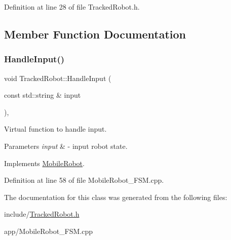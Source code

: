 Definition at line 28 of file Tracked\+Robot.\+h.



\subsection{Member Function Documentation}
\mbox{\label{class_tracked_robot_a3522a61808d4bb1eb1779c9b8589b8f0}} 
\subsubsection{\texorpdfstring{HandleInput()}{HandleInput()}}
{\footnotesize\ttfamily void Tracked\+Robot\+::\+Handle\+Input (\begin{DoxyParamCaption}\item[{const std\+::string \&}]{input }\end{DoxyParamCaption})\hspace{0.3cm}{\ttfamily [override]}, {\ttfamily [virtual]}}



Virtual function to handle input. 


\begin{DoxyParams}{Parameters}
{\em input} & -\/ input robot state. \\
\hline
\end{DoxyParams}


Implements \mbox{\hyperlink{class_mobile_robot_a703aa7c008b6e9b5beb5017e7a6d020e}{Mobile\+Robot}}.



Definition at line 58 of file Mobile\+Robot\+\_\+\+F\+S\+M.\+cpp.



The documentation for this class was generated from the following files\+:\begin{DoxyCompactItemize}
\item 
include/\mbox{\hyperlink{_tracked_robot_8h}{Tracked\+Robot.\+h}}\item 
app/Mobile\+Robot\+\_\+\+F\+S\+M.\+cpp\end{DoxyCompactItemize}
